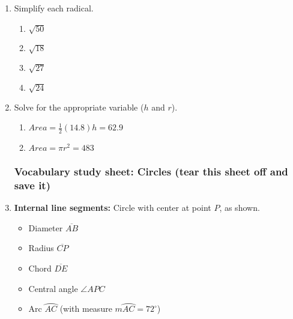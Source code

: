 \documentclass[12pt, twoside]{article}
\begin{document}
\begin{enumerate}
  \item Simplify each radical.
  \begin{multicols}{2}
    \begin{enumerate}[itemsep=2cm]
      \item $\sqrt{50}$ 
      \item $\sqrt{18}$
      \item $\sqrt{27}$ 
      \item $\sqrt{24}$ 
    \end{enumerate}
    \end{multicols}\vspace{2cm}
  
  \item Solve for the appropriate variable ($h$ and $r$).
    \begin{multicols}{2}
    \begin{enumerate}[itemsep=2cm]
      \item $Area=\frac{1}{2}(14.8)h=62.9$ 
      \item $Area=\pi r^2=483$ 
    \end{enumerate}
    \end{multicols}\vspace{2cm}
    
\newpage
\subsubsection*{Vocabulary study sheet: Circles (tear this sheet off and save it)}

  \item \textbf{Internal line segments:} Circle with center at point $P$, as shown.
    \begin{multicols}{2}
      \begin{itemize}
        \item Diameter $\overline{AB}$
        \item Radius $\overline{CP}$
        \item Chord $\overline{DE}$
        \item Central angle $\angle APC$
        \item Arc $\wideparen{AC}$ (with measure $m\wideparen{AC} = 72^\circ$)
      \end{itemize}
  \end{multicols}


\end{enumerate}
\end{document}
